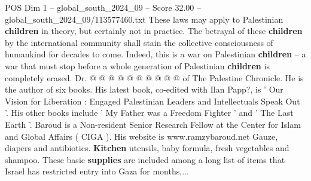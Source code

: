 \begin{textsample}{POS Dim 1 – global\_south\_2024\_09 – Score 32.00 – global\_south\_2024\_09/113577460.txt}
These laws may apply to Palestinian \textbf{children} in theory, but certainly not in practice.
The betrayal of these \textbf{children} by the international community shall stain the collective consciousness of humankind for decades to come.
Indeed, this is a war on Palestinian \textbf{children} -- a war that must stop before a whole generation of Palestinian \textbf{children} is completely erased.
Dr. @ @ @ @ @ @ @ @ @ @ of The Palestine Chronicle.
He is the author of six books.
His latest book, co-edited with Ilan Papp?, is ' Our Vision for Liberation : Engaged Palestinian Leaders and Intellectuals Speak Out '.
His other books include ' My Father was a Freedom Fighter ' and ' The Last Earth '.
Baroud is a Non-resident Senior Research Fellow at the Center for Islam and Global Affairs ( CIGA ).
His website is www.ramzybaroud.net Gauze, diapers and antibiotics. \textbf{Kitchen} utensils, baby formula, fresh vegetables and shampoo.
These basic \textbf{supplies} are included among a long list of items that Israel has restricted entry into Gaza for months,...

\end{textsample}
